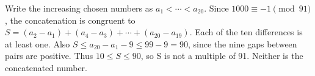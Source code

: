 Write the increasing chosen numbers as $a_1<\cdots<a_{20}$. Since $1000\equiv-1\pmod{91}$, the concatenation is congruent to $S=(a_2-a_1)+(a_4-a_3)+\cdots+(a_{20}-a_{19})$. Each of the ten differences is at least one. Also $S\le a_{20}-a_1-9\le99-9=90$, since the nine gaps between pairs are positive. Thus $10\le S\le90$, so S is not a multiple of 91. Neither is the concatenated number.
